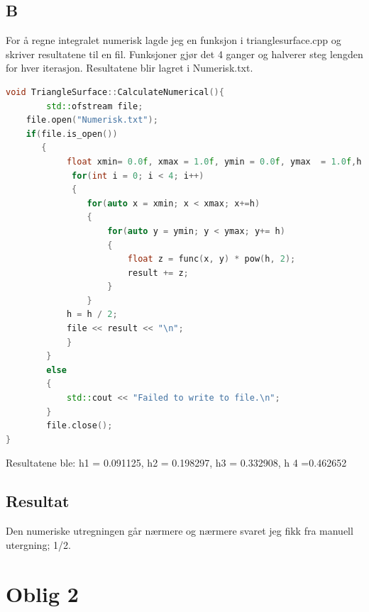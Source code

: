 \documentclass[a4paper,norsk]{article}
\begin{document}
\subsection{B}
For å regne integralet numerisk lagde jeg en funksjon i trianglesurface.cpp og skriver resultatene til en fil.
Funksjoner gjør det 4 ganger og halverer steg lengden for hver iterasjon. Resultatene blir lagret i Numerisk.txt.
\begin{lstlisting}[language=C++, caption={trianglesurface.cpp}]
void TriangleSurface::CalculateNumerical(){
    	std::ofstream file;
   	file.open("Numerisk.txt");
	if(file.is_open())
       {
        	float xmin= 0.0f, xmax = 1.0f, ymin = 0.0f, ymax  = 1.0f,h = 0.1f, result = 0;
             for(int i = 0; i < 4; i++)
             {
                for(auto x = xmin; x < xmax; x+=h)
                {
                    for(auto y = ymin; y < ymax; y+= h)
                    {
                        float z = func(x, y) * pow(h, 2);
                        result += z;
                    }
                }
            h = h / 2;
            file << result << "\n";
            }
        }
        else
        {
            std::cout << "Failed to write to file.\n";
        }
        file.close();
}
\end{lstlisting}
Resultatene ble:
h1 = 0.091125,
h2 = 0.198297,
h3 = 0.332908,
h 4 =0.462652


\subsection{Resultat}
Den numeriske utregningen går nærmere og nærmere svaret jeg fikk fra manuell utergning; 1/2. 
\section{Oblig 2}
\end{document}
